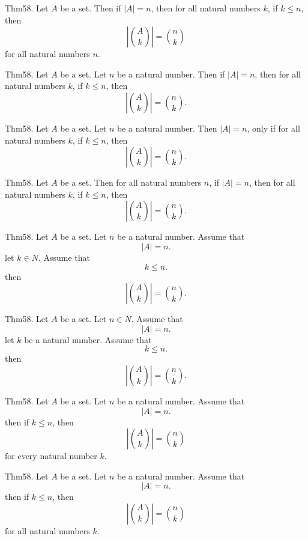 \documentclass{article}
\begin{document}
Thm58. Let $A$ be a set. Then if $| A | = n$, then for all natural numbers $k$, if $k \leq n$, then $$| \binom{ A }{ k}| = \binom{ n }{ k}$$ for all natural numbers $n$.

Thm58. Let $A$ be a set. Let $n$ be a natural number. Then if $| A | = n$, then for all natural numbers $k$, if $k \leq n$, then $$| \binom{ A }{ k}| = \binom{ n }{ k}.$$

Thm58. Let $A$ be a set. Let $n$ be a natural number. Then $| A | = n$, only if for all natural numbers $k$, if $k \leq n$, then $$| \binom{ A }{ k}| = \binom{ n }{ k}.$$

Thm58. Let $A$ be a set. Then for all natural numbers $n$, if $| A | = n$, then for all natural numbers $k$, if $k \leq n$, then $$| \binom{ A }{ k}| = \binom{ n }{ k}.$$

Thm58. Let $A$ be a set. Let $n$ be a natural number. Assume that $$| A | = n.$$ let $k \in N$. Assume that $$k \leq n.$$ then $$| \binom{ A }{ k}| = \binom{ n }{ k}.$$

Thm58. Let $A$ be a set. Let $n \in N$. Assume that $$| A | = n.$$ let $k$ be a natural number. Assume that $$k \leq n.$$ then $$| \binom{ A }{ k}| = \binom{ n }{ k}.$$

Thm58. Let $A$ be a set. Let $n$ be a natural number. Assume that $$| A | = n.$$ then if $k \leq n$, then $$| \binom{ A }{ k}| = \binom{ n }{ k}$$ for every natural number $k$.

Thm58. Let $A$ be a set. Let $n$ be a natural number. Assume that $$| A | = n.$$ then if $k \leq n$, then $$| \binom{ A }{ k}| = \binom{ n }{ k}$$ for all natural numbers $k$.
\end{document}
